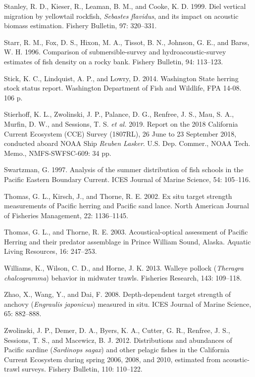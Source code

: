 \documentclass[]{article}
\begin{document}
\leavevmode\hypertarget{ref-Stanley1999}{}%
Stanley, R. D., Kieser, R., Leaman, B. M., and Cooke, K. D. 1999. Diel vertical migration by yellowtail rockfish, \emph{Sebastes flavidus}, and its impact on acoustic biomass estimation. Fishery Bulletin, 97: 320--331.

\leavevmode\hypertarget{ref-Starr1996}{}%
Starr, R. M., Fox, D. S., Hixon, M. A., Tissot, B. N., Johnson, G. E., and Barss, W. H. 1996. Comparison of submersible-survey and hydroacoustic-survey estimates of fish density on a rocky bank. Fishery Bulletin, 94: 113--123.

\leavevmode\hypertarget{ref-Stick2014}{}%
Stick, K. C., Lindquist, A. P., and Lowry, D. 2014. Washington State herring stock status report. Washington Department of Fish and Wildlife, FPA 14-08. 106 p.

\leavevmode\hypertarget{ref-Stierhoff2019}{}%
Stierhoff, K. L., Zwolinski, J. P., Palance, D. G., Renfree, J. S., Mau, S. A., Murfin, D. W., and Sessions, T. S. \emph{et al.} 2019. Report on the 2018 California Current Ecosystem (CCE) Survey (1807RL), 26 June to 23 September 2018, conducted aboard NOAA Ship \emph{Reuben Lasker}. U.S. Dep. Commer., NOAA Tech. Memo., NMFS-SWFSC-609: 34 pp.

\leavevmode\hypertarget{ref-Swartzman1997}{}%
Swartzman, G. 1997. Analysis of the summer distribution of fish schools in the Pacific Eastern Boundary Current. ICES Journal of Marine Science, 54: 105--116.

\leavevmode\hypertarget{ref-Thomas2002}{}%
Thomas, G. L., Kirsch, J., and Thorne, R. E. 2002. Ex situ target strength measurements of Pacific herring and Pacific sand lance. North American Journal of Fisheries Management, 22: 1136--1145.

\leavevmode\hypertarget{ref-Thomas2003}{}%
Thomas, G. L., and Thorne, R. E. 2003. Acoustical-optical assessment of Pacific Herring and their predator assemblage in Prince William Sound, Alaska. Aquatic Living Resources, 16: 247--253.

\leavevmode\hypertarget{ref-Williams2013}{}%
Williams, K., Wilson, C. D., and Horne, J. K. 2013. Walleye pollock (\emph{Theragra chalcogramma}) behavior in midwater trawls. Fisheries Research, 143: 109--118.

\leavevmode\hypertarget{ref-Zhao2008}{}%
Zhao, X., Wang, Y., and Dai, F. 2008. Depth-dependent target strength of anchovy (\emph{Engraulis japonicus}) measured in situ. ICES Journal of Marine Science, 65: 882--888.

\leavevmode\hypertarget{ref-Zwolinski2012}{}%
Zwolinski, J. P., Demer, D. A., Byers, K. A., Cutter, G. R., Renfree, J. S., Sessions, T. S., and Macewicz, B. J. 2012. Distributions and abundances of Pacific sardine (\emph{Sardinops sagax}) and other pelagic fishes in the California Current Ecosystem during spring 2006, 2008, and 2010, estimated from acoustic-trawl surveys. Fishery Bulletin, 110: 110--122.
\end{document}
